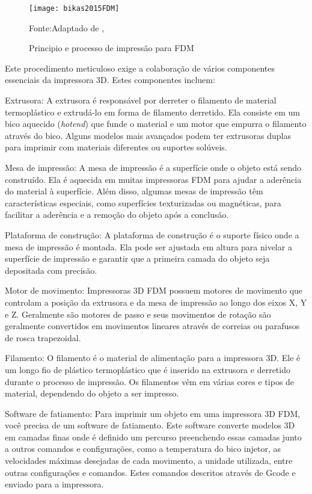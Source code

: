 \begin{figure}[H]
    \begin{center}
    \caption{Principio e processo de impressão para FDM}
    \texttt{[image: bikas2015FDM]}

    {\footnotesize Fonte:Adaptado de \citeauthor{bikas16}, \citeyear{bikas16}}
    \label{fig:fdm_ex}
    \end{center}
\end{figure}

Este procedimento meticuloso exige a colaboração de vários componentes essenciais da impressora 3D. Estes componentes incluem:

Extrusora: A extrusora é responsável por derreter o filamento de material termoplástico e extrudá-lo em forma de filamento derretido. Ela consiste em um bico aquecido (\textit{hotend}) que funde o material e um motor que empurra o filamento através do bico. Alguns modelos mais avançados podem ter extrusoras duplas para imprimir com materiais diferentes ou suportes solúveis.

Mesa de impressão: A mesa de impressão é a superfície onde o objeto está sendo construído. Ela é aquecida em muitas impressoras FDM para ajudar a aderência do material à superfície. Além disso, algumas mesas de impressão têm características especiais, como superfícies texturizadas ou magnéticas, para facilitar a aderência e a remoção do objeto após a conclusão.

Plataforma de construção: A plataforma de construção é o suporte físico onde a mesa de impressão é montada. Ela pode ser ajustada em altura para nivelar a superfície de impressão e garantir que a primeira camada do objeto seja depositada com precisão.

Motor de movimento: Impressoras 3D FDM possuem motores de movimento que controlam a posição da extrusora e da mesa de impressão ao longo dos eixos X, Y e Z. Geralmente são motores de passo e seus movimentos de rotação são geralmente convertidos em movimentos lineares através de correias ou parafusos de rosca trapezoidal.

Filamento: O filamento é o material de alimentação para a impressora 3D. Ele é um longo fio de plástico termoplástico que é inserido na extrusora e derretido durante o processo de impressão. Os filamentos vêm em várias cores e tipos de material, dependendo do objeto a ser impresso.

Software de fatiamento: Para imprimir um objeto em uma impressora 3D FDM, você precisa de um software de fatiamento. Este software converte modelos 3D em camadas finas onde é definido um percurso preenchendo essas camadas junto a outros comandos e configurações, como a temperatura do bico injetor, as velocidades máximas desejadas de cada movimento, a unidade utilizada, entre outras configurações e comandos. Estes comandos descritos através de Gcode e enviado para a impressora. 

